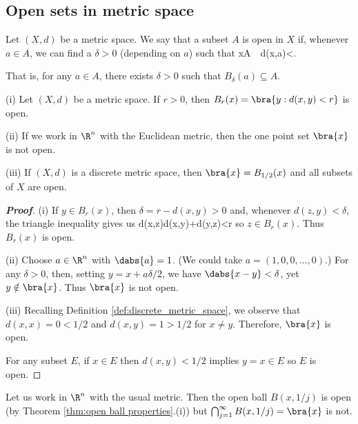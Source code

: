 \subsection{Open sets in metric space}

\begin{definition}\label{def:open_set_metric_space}
Let $(X,d)$ be a metric space. We say that a subset $A$ is open in $X$ if, whenever $a\in A$, we can find a $\delta>0$ (depending on $a$) such that
\be
x\in A\ \ d(x,a)<\delta.
\ee

That is, for any $a\in A$, there exists $\delta >0$ such that $B_\delta(a) \subseteq A$.
\end{definition}

\begin{theorem}\label{thm:open_ball_properties}
\ben
\item [(i)] Let $(X,d)$ be a metric space. If $r>0$, then $B_r(x)=\bra{y:d(x,y)<r}$ is open.
\item [(ii)] If we work in $\R^n$ with the Euclidean metric, then the one point set $\bra{x}$ is not open.
\item [(iii)] If $(X,d)$ is a discrete metric space, then $\bra{x} = B_{1/2}(x)$ and all subsets of $X$ are open.
\een
\end{theorem}

\begin{proof}[\bf Proof]
\ben
\item [(i)] If $y\in B_r(x)$, then $\delta=r-d(x,y)>0$ and, whenever $d(z,y)<\delta$, the triangle inequality gives us
\be
d(x,z)\leq d(x,y)+d(y,z)<r
\ee
so $z\in B_r(x)$. Thus $B_r(x)$ is open.

\item [(ii)] Choose $a \in \R^{n}$ with $\dabs{a}=1$. (We could take $a=(1,0,0,\dots,0)$.) For any $\delta>0$, then, setting $y=x+ a\delta/2$,
we have $\dabs{x-y} < \delta$, yet $y \notin \bra{x}$. Thus $\bra{x}$ is not open.

\item [(iii)] Recalling Definition \ref{def:discrete_metric_space}, we observe that $d(x,x)=0<1/2$ and $d(x,y)=1>1/2$ for $x\neq y$. Therefore, $\bra{x}$ is open.

For any subset $E$, if $x\in E$ then $d(x,y)<1/2$ implies $y=x\in E$ so $E$ is open.
\een
\end{proof}

\begin{example}\label{exa:countable intersection open_set_metric_space}
Let us work in $\R^{n}$ with the usual metric. Then the open ball $B(x,1/j)$ is open (by Theorem \ref{thm:open ball properties}.(i)) but
$\bigcap_{j=1}^{\infty} B(x,1/j)=\bra{x}$ is not.
\end{example}

